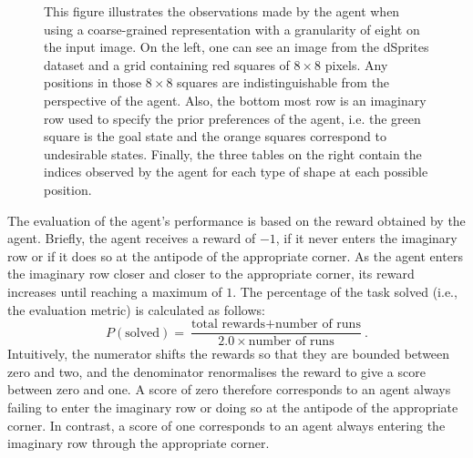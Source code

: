 \documentclass[twoside,11pt]{article}
\begin{document}
{\begin{figure}[H]
\begin{center}
	\end{center}
\vspace{-0.25cm}
    \caption{
This figure illustrates the observations made by the agent when using a coarse-grained representation with a granularity of eight on the input image. On the left, one can see an image from the dSprites dataset and a grid containing red squares of $8\times8$ pixels. Any positions in those $8\times8$ squares are indistinguishable from the perspective of the agent. Also, the bottom most row is an imaginary row used to specify the prior preferences of the agent, i.e. the green square is the goal state and the orange squares correspond to undesirable states. Finally, the three tables on the right contain the indices observed by the agent for each type of shape at each possible position.}
    \label{fig:down_sampling}
\end{figure}
}

The evaluation of the agent's performance is based on the reward obtained by the agent. Briefly, the agent receives a reward of $-1$, if it never enters the imaginary row or if it does so at the antipode of the appropriate corner. As the agent enters the imaginary row closer and closer to the appropriate corner, its reward increases until reaching a maximum of $1$. The percentage of the task solved (i.e., the evaluation metric) is calculated as follows:
$$P(\text{solved}) = \frac{\text{total rewards} + \text{number of runs}}{2.0 \times \text{number of runs}}.$$
Intuitively, the numerator shifts the rewards so that they are bounded between zero and two, and the denominator renormalises the reward to give a score between zero and one. A score of zero therefore corresponds to an agent always failing to enter the imaginary row or doing so at the antipode of the appropriate corner. In contrast, a score of one corresponds to an agent always entering the imaginary row through the appropriate corner.
\end{document}
